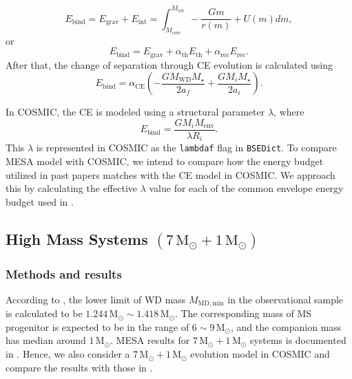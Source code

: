 \documentclass[12pt]{article}
\newcommand{\Msun}{\,\mathrm{M_{\odot}}}
\newcommand{\MWD}{M_{\mathrm{WD}}}
\newcommand{\Mstar}{M_{\star}}
\newcommand{\alphace}{\alpha_{\mathrm{CE}}}
\newcommand{\alphath}{\alpha_{\mathrm{th}}}
\newcommand{\alpharec}{\alpha_{\mathrm{rec}}}
\newcommand{\Ebind}{E_{\mathrm{bind}}}
\begin{document}
\begin{equation}
  E_{\mathrm{bind}} = E_{\mathrm{grav}} + E_{\mathrm{int}} = \int_{M_{\mathrm{core}}}^{M_{\mathrm{tot}}} -\frac{Gm}{r(m)} + U(m) dm,
  \label{budget-int}
\end{equation}
or
\begin{equation}
  E_{\mathrm{bind}} = E_{\mathrm{grav}} + \alphath E_{\mathrm{th}} + \alpharec E_{\mathrm{rec}}.
  \label{budget-th-rec}
\end{equation}
After that, the change of separation through CE evolution is calculated using
\begin{equation}
  E_{\mathrm{bind}} = \alphace \left(-\frac{G\MWD \Mstar}{2a_f}+\frac{GM_i \Mstar}{2a_i}\right).
  \label{ebind-sep}
\end{equation}

In COSMIC, the CE is modeled using a structural parameter $\lambda$, where
\begin{equation}
  \Ebind = \frac{G M_i M_{\mathrm{env}}}{\lambda R_i}.   
  \label{ebind}
\end{equation}
This $\lambda$ is represented in COSMIC as the \verb|lambdaf| flag in \verb|BSEDict|. To compare MESA model with COSMIC, we intend to compare how the energy budget utilized in past papers matches with the CE model in COSMIC. We approach this by calculating the effective $\lambda$ value for each of the common envelope energy budget used in \cite{yamaguchi_hi, yamaguchi_lo}. 

\subsection{High Mass Systems $(7 \Msun + 1 \Msun)$} \label{subsec:high}

\subsubsection{Methods and results}

According to \cite{yamaguchi_hi}, the lower limit of WD mass $M_{\mathrm{MD, min}}$ in the observational sample is calculated to be $1.244\Msun \sim 1.418\Msun$. The corresponding mass of MS progenitor is expected to be in the range of $6 \sim 9 \Msun$, and the companion mass has median around $1\Msun$. MESA results for $7\Msun + 1\Msun$ systems is documented in \cite{yamaguchi_hi}. Hence, we also consider a $7\Msun + 1\Msun$ evolution model in COSMIC and compare the results with those in \cite{yamaguchi_hi}.
\end{document}
